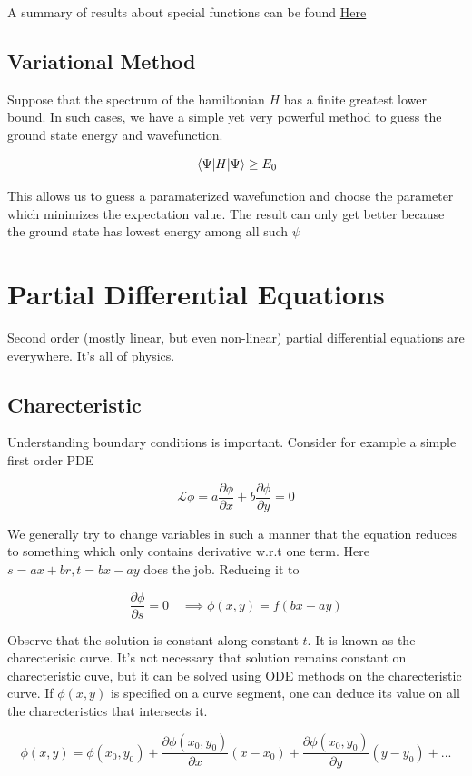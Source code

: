 \documentclass{report}
\begin{document}
A summary of results about special functions can be found \href{https://webspace.science.uu.nl/~hooft101/lectures/specialfct.pdf}{Here}

\subsection{Variational Method}
Suppose that the spectrum of the hamiltonian $H$ has a finite greatest lower bound. In such cases, we have a simple yet very powerful method to guess the ground state energy and wavefunction.


$$\expval{H}{\Psi} \ge E_0$$

\noindent This allows us to guess a paramaterized wavefunction and choose the parameter which minimizes the expectation value. The result can only get better because the ground state has lowest energy among all such $\psi$


\section{Partial Differential Equations}
Second order (mostly linear, but even non-linear) partial differential equations are everywhere. It's all of physics. 

\subsection{Charecteristic}
Understanding boundary conditions is important. Consider for example a simple first order PDE

$$\mathcal{L}\phi = a\frac{\partial\phi}{\partial x} + b\frac{\partial\phi}{\partial y} = 0$$

\noindent We generally try to change variables in such a manner that the equation reduces to something which only contains derivative w.r.t one term. Here $s = ax+br, t= bx-ay$ does the job. Reducing it to 

$$\frac{\partial\phi}{\partial s} = 0 \quad\implies \phi(x,y) = f(bx-ay)$$

\noindent Observe that the solution is constant along constant $t$. It is known as the charecterisic curve. It's not necessary that solution remains constant on charecteristic cuve, but it can be solved using ODE methods on the charecteristic curve. If $\phi(x,y)$ is specified on a curve segment, one can deduce its value on all the charecteristics that intersects it.

$$\phi(x,y) = \phi(x_0,y_0) + \frac{\partial \phi(x_0,y_0)}{\partial x}(x-x_0) + \frac{\partial\phi(x_0,y_0)}{\partial y}(y-y_0) + ...$$
\end{document}
